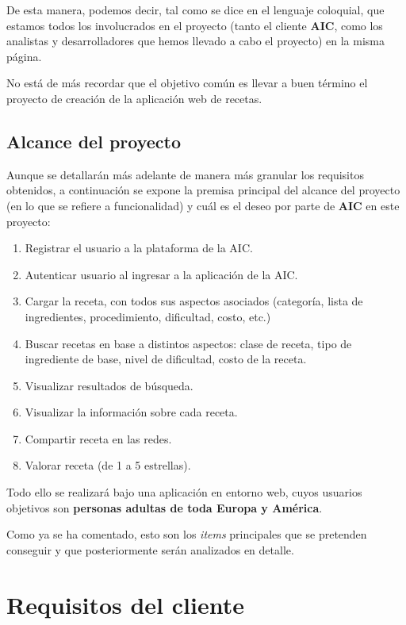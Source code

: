 \documentclass{\ClassPath/viu-tfm-template}
\begin{document}
De esta manera, podemos decir, tal como se dice en el lenguaje coloquial, que estamos todos los involucrados en el proyecto (tanto el cliente \textbf{AIC}, como los analistas y desarrolladores que hemos llevado a cabo el proyecto) en la misma página.

No está de más recordar que el objetivo común es llevar a buen término el proyecto de creación de la aplicación web de recetas.

\section{Alcance del proyecto}
Aunque se detallarán más adelante de manera más granular los requisitos obtenidos, a continuación se expone la premisa principal del alcance del proyecto (en lo que se refiere a funcionalidad) y cuál es el deseo por parte de \textbf{AIC} en este proyecto:

\vspace{-1em}
\begin{enumerate}[label=\alph*)]
    \item Registrar el usuario a la plataforma de la AIC.
    \item Autenticar usuario al ingresar a la aplicación de la AIC.
    \item Cargar la receta, con todos sus aspectos asociados (categoría, lista de
    ingredientes, procedimiento, dificultad, costo, etc.)
    \item Buscar recetas en base a distintos aspectos: clase de receta, tipo de ingrediente
    de base, nivel de dificultad, costo de la receta.
    \item Visualizar resultados de búsqueda.
    \item Visualizar la información sobre cada receta.
    \item Compartir receta en las redes.
    \item Valorar receta (de 1 a 5 estrellas).
\end{enumerate}
\vspace{-1em}

Todo ello se realizará bajo una aplicación en entorno web, cuyos usuarios objetivos son \textbf{personas adultas de toda Europa y América}.


Como ya se ha comentado, esto son los \textit{items} principales que se pretenden conseguir y que posteriormente serán analizados en detalle.



\chapter{Requisitos del cliente}
\end{document}
